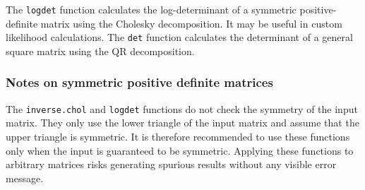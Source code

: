 \documentclass[11pt, a4paper, titlepage]{report}
\begin{document}
The \texttt{logdet} function calculates the log-determinant of a
symmetric positive-definite matrix using the Cholesky
decomposition. It may be useful in custom likelihood calculations. The
\texttt{det} function calculates the determinant of a general square
matrix using the QR decomposition.

\subsubsection{Notes on symmetric positive definite matrices}

The \texttt{inverse.chol} and \texttt{logdet} functions do not check
the symmetry of the input matrix. They only use the lower triangle of
the input matrix and assume that the upper triangle is symmetric. It
is therefore recommended to use these functions only when the input is
guaranteed to be symmetric. Applying these functions to arbitrary
matrices risks generating spurious results without any visible error
message. 
\end{document}
